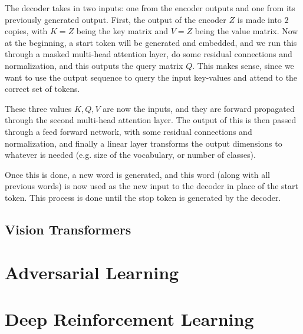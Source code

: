 \documentclass{article}
\begin{document}
    The decoder takes in two inputs: one from the encoder outputs and one from its previously generated output. First, the output of the encoder $Z$ is made into $2$ copies, with $K = Z$ being the key matrix and $V = Z$ being the value matrix. Now at the beginning, a start token will be generated and embedded, and we run this through a masked multi-head attention layer, do some residual connections and normalization, and this outputs the query matrix $Q$. This makes sense, since we want to use the output sequence to query the input key-values and attend to the correct set of tokens. 

    These three values $K, Q, V$ are now the inputs, and they are forward propagated through the second multi-head attention layer. The output of this is then passed through a feed forward network, with some residual connections and normalization, and finally a linear layer transforms the output dimensions to whatever is needed (e.g. size of the vocabulary, or number of classes). 

    Once this is done, a new word is generated, and this word (along with all previous words) is now used as the new input to the decoder in place of the start token. This process is done until the stop token is generated by the decoder. 


  \subsection{Vision Transformers} 

\section{Adversarial Learning}

\section{Deep Reinforcement Learning}




\end{document}
